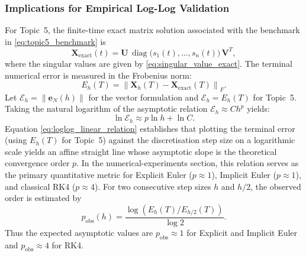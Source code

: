 \subsubsection{Implications for Empirical Log-Log Validation}
For Topic~5, the finite-time exact matrix solution associated with the
benchmark in \eqref{eq:topic5_benchmark} is
\begin{equation}
\label{eq:topic5_exact_matrix_solution}
\mathbf{X}_{\mathrm{exact}}(t)
=
\mathbf{U}\,\operatorname{diag}\bigl(s_1(t),\ldots,s_n(t)\bigr)\,\mathbf{V}^T,
\end{equation}
where the singular values are given by \eqref{eq:singular_value_exact}.
The terminal numerical error is measured in the Frobenius norm:
\begin{equation}
\label{eq:topic5_frobenius_error}
E_h(T)=\left\|\mathbf{X}_h(T)-\mathbf{X}_{\mathrm{exact}}(T)\right\|_F.
\end{equation}
Let $\mathcal{E}_h=\|\mathbf{e}_N(h)\|$ for the vector formulation
and $\mathcal{E}_h=E_h(T)$ for Topic~5. Taking the natural logarithm of
the asymptotic relation $\mathcal{E}_h\approx C h^p$ yields:
\begin{equation}
\label{eq:loglog_linear_relation}
\ln \mathcal{E}_h \approx p \ln h + \ln C.
\end{equation}
Equation \eqref{eq:loglog_linear_relation} establishes that plotting the
terminal error (using $E_h(T)$ for Topic~5) against the discretisation
step size on a logarithmic scale yields an affine straight line whose
asymptotic slope is the theoretical convergence order $p$. In the
numerical-experiments section, this relation serves as the primary
quantitative metric for Explicit Euler ($p\approx1$), Implicit Euler
($p\approx1$), and classical RK4 ($p\approx4$).
For two consecutive step sizes $h$ and $h/2$, the observed order is
estimated by
\begin{equation}
\label{eq:observed_order}
p_{\mathrm{obs}}(h)
=
\frac{\log\left(E_h(T)/E_{h/2}(T)\right)}{\log 2}.
\end{equation}
Thus the expected asymptotic values are $p_{\mathrm{obs}}\approx1$ for
Explicit and Implicit Euler and $p_{\mathrm{obs}}\approx4$ for RK4.

\newpage
